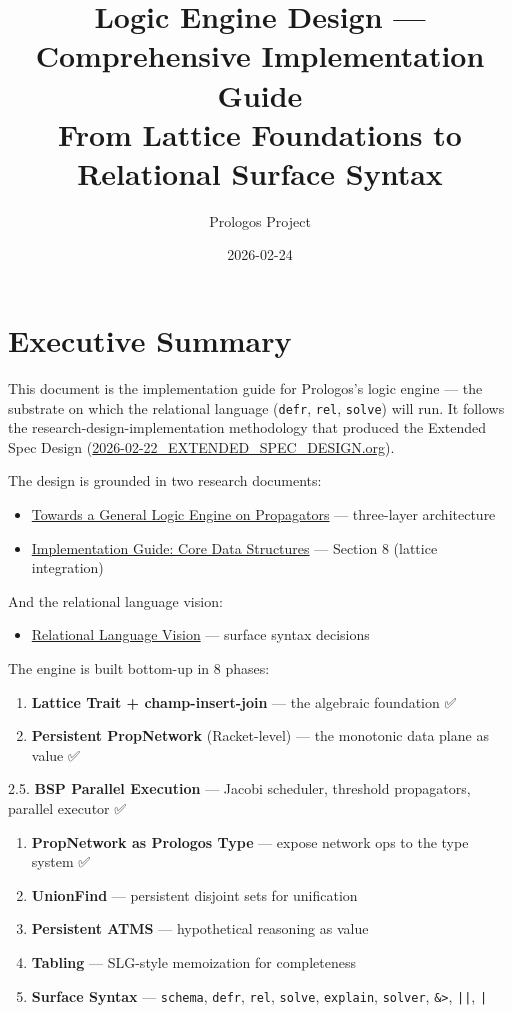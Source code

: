 \documentclass[11pt]{article}
\author{Prologos Project}
\date{2026-02-24}
\title{Logic Engine Design — Comprehensive Implementation Guide\\\medskip
\large From Lattice Foundations to Relational Surface Syntax}
\begin{document}
\maketitle
\tableofcontents

\section{Executive Summary}
\label{sec:orgd9e49df}

This document is the implementation guide for Prologos's logic engine — the
substrate on which the relational language (\texttt{defr}, \texttt{rel}, \texttt{solve}) will run.
It follows the research-design-implementation methodology that produced the
Extended Spec Design (\url{2026-02-22\_EXTENDED\_SPEC\_DESIGN.org}).

The design is grounded in two research documents:
\begin{itemize}
\item \href{2026-02-24\_TOWARDS\_A\_GENERAL\_LOGIC\_ENGINE\_ON\_PROPAGATORS.org}{Towards a General Logic Engine on Propagators} — three-layer architecture
\item \href{../research/IMPLEMENTATION\_GUIDE\_CORE\_DS\_PROLOGOS.md}{Implementation Guide: Core Data Structures} — Section 8 (lattice integration)
\end{itemize}

And the relational language vision:
\begin{itemize}
\item \href{principles/RELATIONAL\_LANGUAGE\_VISION.org}{Relational Language Vision} — surface syntax decisions
\end{itemize}

The engine is built bottom-up in 8 phases:
\begin{enumerate}
\item \textbf{Lattice Trait + champ-insert-join} — the algebraic foundation ✅
\item \textbf{Persistent PropNetwork} (Racket-level) — the monotonic data plane as value ✅
\end{enumerate}
2.5. \textbf{BSP Parallel Execution} — Jacobi scheduler, threshold propagators, parallel executor ✅
\begin{enumerate}
\item \textbf{PropNetwork as Prologos Type} — expose network ops to the type system ✅
\item \textbf{UnionFind} — persistent disjoint sets for unification
\item \textbf{Persistent ATMS} — hypothetical reasoning as value
\item \textbf{Tabling} — SLG-style memoization for completeness
\item \textbf{Surface Syntax} — \texttt{schema}, \texttt{defr}, \texttt{rel}, \texttt{solve}, \texttt{explain}, \texttt{solver}, \texttt{\&>}, \texttt{||}, \texttt{|}
\end{enumerate}
\end{document}
